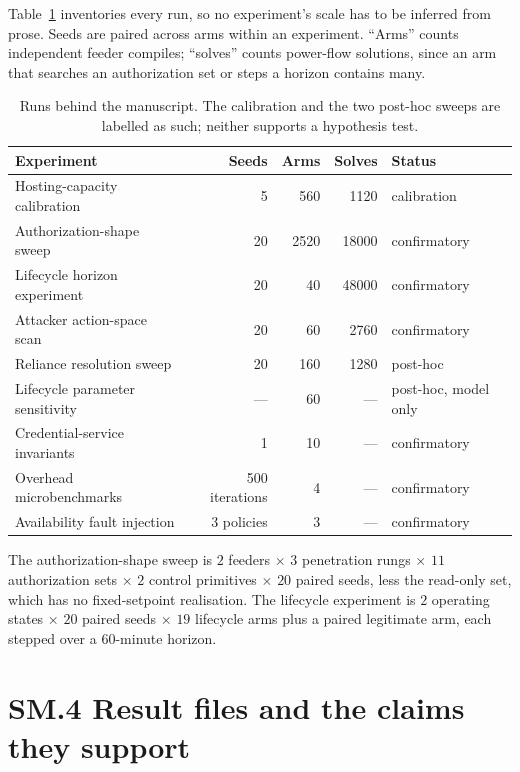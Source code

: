 \documentclass[review]{elsarticle}
\begin{document}
Table~\ref{tab:inventory} inventories every run, so no experiment's scale has to be inferred from
prose. Seeds are paired across arms within an experiment. ``Arms'' counts independent feeder
compiles; ``solves'' counts power-flow solutions, since an arm that searches an authorization set
or steps a horizon contains many.

\begin{table}[h]
\centering
\caption{Runs behind the manuscript. The calibration and the two post-hoc sweeps are labelled as
such; neither supports a hypothesis test.}
\label{tab:inventory}
\small
\begin{tabular}{@{}lrrrl@{}}
\toprule
Experiment & Seeds & Arms & Solves & Status \\
\midrule
Hosting-capacity calibration      & 5   & 560  & 1120  & calibration \\
Authorization-shape sweep         & 20  & 2520 & 18000 & confirmatory \\
Lifecycle horizon experiment      & 20  & 40   & 48000 & confirmatory \\
Attacker action-space scan        & 20  & 60   & 2760  & confirmatory \\
Reliance resolution sweep         & 20  & 160  & 1280  & post-hoc \\
Lifecycle parameter sensitivity   & --- & 60   & ---   & post-hoc, model only \\
Credential-service invariants     & 1   & 10   & ---   & confirmatory \\
Overhead microbenchmarks          & 500 iterations & 4 & --- & confirmatory \\
Availability fault injection      & 3 policies & 3 & --- & confirmatory \\
\bottomrule
\end{tabular}
\end{table}

The authorization-shape sweep is $2$ feeders $\times$ $3$ penetration rungs $\times$ $11$
authorization sets $\times$ $2$ control primitives $\times$ $20$ paired seeds, less the read-only
set, which has no fixed-setpoint realisation. The lifecycle experiment is $2$ operating states
$\times$ $20$ paired seeds $\times$ $19$ lifecycle arms plus a paired legitimate arm, each stepped
over a $60$-minute horizon.

\section*{SM.4 Result files and the claims they support}
\end{document}
